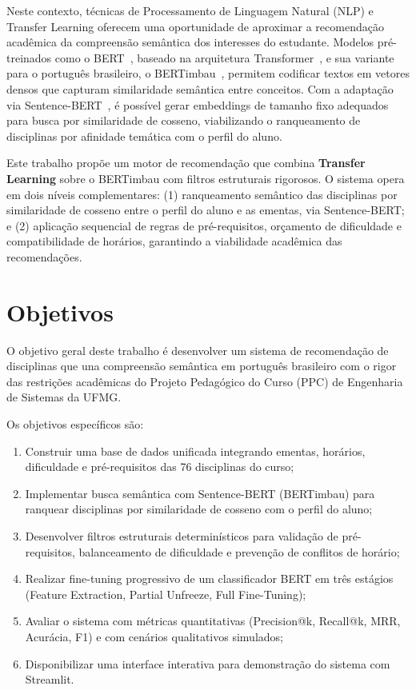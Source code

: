 \documentclass[12pt,a4paper]{article}
\begin{document}
Neste contexto, técnicas de Processamento de Linguagem Natural (NLP) e Transfer Learning oferecem uma oportunidade de aproximar a recomendação acadêmica da compreensão semântica dos interesses do estudante. Modelos pré-treinados como o BERT~\cite{devlin2019bert}, baseado na arquitetura Transformer~\cite{vaswani2017attention}, e sua variante para o português brasileiro, o BERTimbau~\cite{souza2020bertimbau}, permitem codificar textos em vetores densos que capturam similaridade semântica entre conceitos. Com a adaptação via Sentence-BERT~\cite{reimers2019sentence}, é possível gerar embeddings de tamanho fixo adequados para busca por similaridade de cosseno, viabilizando o ranqueamento de disciplinas por afinidade temática com o perfil do aluno.

Este trabalho propõe um motor de recomendação que combina \textbf{Transfer Learning} sobre o BERTimbau com filtros estruturais rigorosos. O sistema opera em dois níveis complementares: (1) ranqueamento semântico das disciplinas por similaridade de cosseno entre o perfil do aluno e as ementas, via Sentence-BERT; e (2) aplicação sequencial de regras de pré-requisitos, orçamento de dificuldade e compatibilidade de horários, garantindo a viabilidade acadêmica das recomendações.

\section{Objetivos}

O objetivo geral deste trabalho é desenvolver um sistema de recomendação de disciplinas que una compreensão semântica em português brasileiro com o rigor das restrições acadêmicas do Projeto Pedagógico do Curso (PPC) de Engenharia de Sistemas da UFMG.

Os objetivos específicos são:

\begin{enumerate}
    \item Construir uma base de dados unificada integrando ementas, horários, dificuldade e pré-requisitos das 76 disciplinas do curso;
    \item Implementar busca semântica com Sentence-BERT (BERTimbau) para ranquear disciplinas por similaridade de cosseno com o perfil do aluno;
    \item Desenvolver filtros estruturais determinísticos para validação de pré-requisitos, balanceamento de dificuldade e prevenção de conflitos de horário;
    \item Realizar fine-tuning progressivo de um classificador BERT em três estágios (Feature Extraction, Partial Unfreeze, Full Fine-Tuning);
    \item Avaliar o sistema com métricas quantitativas (Precision@k, Recall@k, MRR, Acurácia, F1) e com cenários qualitativos simulados;
    \item Disponibilizar uma interface interativa para demonstração do sistema com Streamlit.
\end{enumerate}
\end{document}
